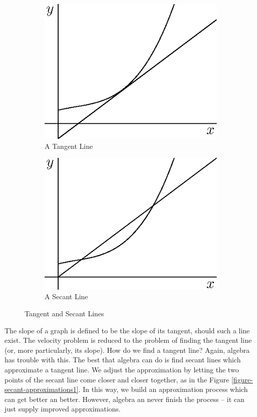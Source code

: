 \documentclass[fleqn]{report}
\begin{document}
\begin{figure}[ht]
\centering
\begin{subfigure}{.5\textwidth}
 \centering
 \includegraphics{figure11.eps}
 \caption{A Tangent Line}
\end{subfigure}%
\begin{subfigure}{.5\textwidth}
 \centering
 \includegraphics{figure12.eps}
 \caption{A Secant Line}
\end{subfigure}
\caption{Tangent and Secant Lines}
\label{figure-secant-lines}
\end{figure}

The slope of a graph is defined to be the slope of its
tangent, should such a line exist. The velocity problem is
reduced to the problem of finding the tangent line (or, more
particularly, its slope). How do we find a tangent line?
Again, algebra has trouble with this.  The best that algebra
can do is find secant lines which approximate a tangent line.
We adjust the approximation by letting the two points of the
secant line come closer and closer together, as in the Figure
\ref{figure-secant-approximations1}. In this way, we build an
approximation process which can get better an better. However,
algebra an never finish the process -- it can just supply
improved approximations.
\end{document}
